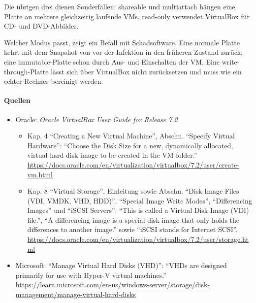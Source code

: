 Die übrigen drei dienen Sonderfällen: shareable und multiattach hängen eine Platte an mehrere gleichzeitig laufende VMs, read-only verwendet VirtualBox für CD- und DVD-Abbilder.

Welcher Modus passt, zeigt ein Befall mit Schadsoftware. Eine normale Platte kehrt mit dem Snapshot von vor der Infektion in den früheren Zustand zurück, eine immutable-Platte schon durch Aus- und Einschalten der VM. Eine write-through-Platte lässt sich über VirtualBox nicht zurücksetzen und muss wie ein echter Rechner bereinigt werden.

\paragraph{Quellen}
\begin{itemize}[quellen]
  \item Oracle: \emph{Oracle VirtualBox User Guide for Release 7.2}
  \begin{itemize}[nosep]
    \item Kap. 4 \enquote{Creating a New Virtual Machine}, Abschn. \enquote{Specify Virtual Hardware}: \enquote{Choose the Disk Size for a new, dynamically allocated, virtual hard disk image to be created in the VM folder.} \url{https://docs.oracle.com/en/virtualization/virtualbox/7.2/user/create-vm.html}
    \item Kap. 8 \enquote{Virtual Storage}, Einleitung sowie Abschn. \enquote{Disk Image Files (VDI, VMDK, VHD, HDD)}, \enquote{Special Image Write Modes}, \enquote{Differencing Images} und \enquote{iSCSI Servers}: \enquote{This is called a Virtual Disk Image (VDI) file.}, \enquote{A differencing image is a special disk image that only holds the differences to another image.} sowie \enquote{iSCSI stands for Internet SCSI}. \url{https://docs.oracle.com/en/virtualization/virtualbox/7.2/user/storage.html}
  \end{itemize}
  \item Microsoft: \enquote{Manage Virtual Hard Disks (VHD)}: \enquote{VHDs are designed primarily for use with Hyper-V virtual machines.} \url{https://learn.microsoft.com/en-us/windows-server/storage/disk-management/manage-virtual-hard-disks}
\end{itemize}

\begin{aufgabe}
\end{aufgabe}
\label{sec:sharedfolder}


